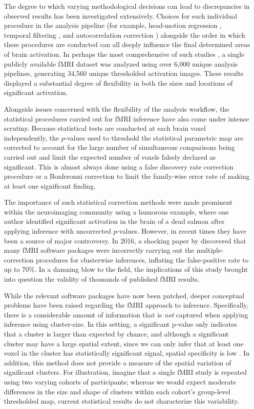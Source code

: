 The degree to which varying methodological decisions can lead to discrepancies in observed results has been investigated extensively. Choices for each individual procedure in the analysis pipeline (for example, head-motion regression \citep{Lund2005-sf}, temporal filtering \citep{Skudlarski1999-ao}, and autocorrelation correction \citep{Woolrich2001-tk}) alongside the order in which these procedures are conducted \citep{Carp2013-cm} can all deeply influence the final determined areas of brain activation. In perhaps the most comprehensive of such studies \citep{Carp2012-ph}, a single publicly available fMRI dataset was analyzed using over 6,000 unique analysis pipelines, generating 34,560 unique thresholded activation images. These results displayed a substantial degree of flexibility in both the sizes and locations of significant activation.

Alongside issues concerned with the flexibility of the analysis workflow, the statistical procedures carried out for fMRI inference have also come under intense scrutiny. Because statistical tests are conducted at each brain voxel independently, the $p$-values used to threshold the statistical parametric map are corrected to account for the large number of simultaneous comparisons being carried out and limit the expected number of voxels falsely declared as significant. This is almost always done using a false discovery rate correction procedure or a Bonferonni correction to limit the family-wise error rate of making at least one significant finding. 

The importance of such statistical correction methods were made prominent within the neuroimaging community using a humorous example, where one author identified significant activation in the brain of a dead salmon after applying inference with uncorrected $p$-values. However, in recent times they have been a source of major controversy. In 2016, a shocking paper by \citet*{Eklund2016-ak} discovered that many fMRI software packages were incorrectly carrying out the multiple-correction procedures for clusterwise inferences, inflating the false-positive rate to up to 70\%. In a damning blow to the field, the implications of this study brought into question the validity of thousands of published fMRI results. 

While the relevant software packages have now been patched, deeper conceptual problems have been raised regarding the fMRI approach to inference. Specifically, there is a considerable amount of information that is \textit{not} captured when applying inference using cluster-size. In this setting, a significant p-value only indicates that a cluster is larger than expected by chance, and although a significant cluster may have a large spatial extent, since we can only infer that at least one voxel in the cluster has statistically significant signal, spatial specificity is low \citep{Woo2014-ji}. In addition, this method does not provide a measure of the spatial variation of significant clusters. For illustration, imagine that a single fMRI study is repeated using two varying cohorts of participants; whereas we would expect moderate differences in the size and shape of clusters within each cohort's group-level thresholded map, current statistical results do not characterize this variability. 

